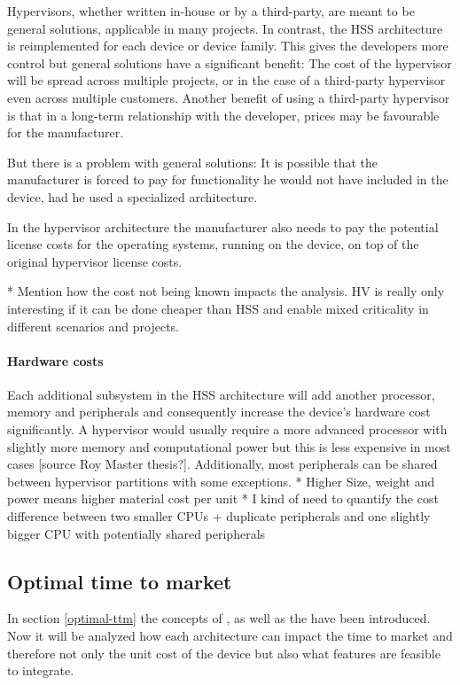Hypervisors, whether written in-house or by a third-party, are meant to be general solutions, applicable in many projects. In contrast, the \gls{HSS} architecture is reimplemented for each device or device family. This gives the developers more control but general solutions have a significant benefit: The cost of the hypervisor will be spread across multiple projects, or in the case of a third-party hypervisor even across multiple customers. Another benefit of using a third-party hypervisor is that in a long-term relationship with the developer, prices may be favourable for the manufacturer.

But there is a problem with general solutions: It is possible that the manufacturer is forced to pay for functionality he would not have included in the device, had he used a specialized architecture. 

In the hypervisor architecture the manufacturer also needs to pay the potential license costs for the operating systems, running on the device, on top of the original hypervisor license costs.
 

* Mention how the cost not being known impacts the analysis. HV is really only interesting if it can be done cheaper than HSS and enable mixed criticality in different scenarios and projects. 

\paragraph{Hardware costs}
Each additional subsystem in the \gls{HSS} architecture will add another processor, memory and peripherals and consequently increase the device's hardware cost significantly. A hypervisor would usually require a more advanced processor with slightly more memory and computational power but this is less expensive in most cases [source Roy Master thesis?]. Additionally, most peripherals can be shared between hypervisor partitions with some exceptions.
* Higher Size, weight and power means higher material cost per unit
	* I kind of need to quantify the cost difference between two smaller CPUs 		+ duplicate peripherals and one slightly bigger CPU with potentially 		shared peripherals

\subsection{Optimal time to market}
In section \ref{optimal-ttm} the concepts of , as well as the have been introduced. Now it will be analyzed how each architecture can impact the time to market and therefore not only the unit cost of the device but also what features are feasible to integrate.

